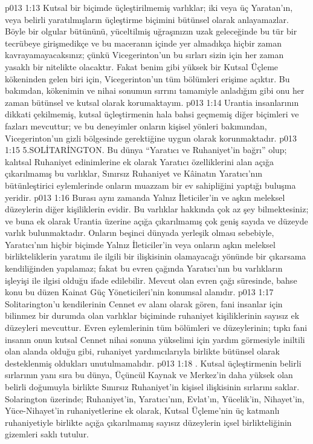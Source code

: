 \vs p013 1:13 Kutsal bir biçimde üçleştirilmemiş varlıklar; iki veya üç Yaratan’ın, veya belirli yaratılmışların üçleştirme biçimini bütünsel olarak anlayamazlar. Böyle bir olgular bütününü, yüceltilmiş uğraşınızın uzak geleceğinde bu tür bir tecrübeye girişmedikçe ve bu maceranın içinde yer almadıkça hiçbir zaman kavrayamayacaksınız; çünkü Vicegerinton’un bu sırları sizin için her zaman yasaklı bir nitelikte olacaktır. Fakat benim gibi yüksek bir Kutsal Üçleme kökeninden gelen biri için, Vicegerinton’un tüm bölümleri erişime açıktır. Bu bakımdan, kökenimin ve nihai sonumun sırrını tamamiyle anladığım gibi onu her zaman bütünsel ve kutsal olarak korumaktayım.
\vs p013 1:14 Urantia insanlarının dikkati çekilmemiş, kutsal üçleştirmenin hala bahsi geçmemiş diğer biçimleri ve fazları mevcuttur; ve bu deneyimler onların kişisel yönleri bakımından, Vicegerinton’un gizli bölgesinde gerektiğine uygun olarak korunmaktadır.
\vs p013 1:15 5.\bibnobreakspace SOLİTARİNGTON. Bu dünya “Yaratıcı ve Ruhaniyet’in bağrı” olup; kalıtsal Ruhaniyet edinimlerine ek olarak Yaratıcı özelliklerini alan açığa çıkarılmamış bu varlıklar, Sınırsız Ruhaniyet ve Kâinatın Yaratıcı’nın bütünleştirici eylemlerinde onların muazzam bir ev sahipliğini yaptığı buluşma yeridir.
\vs p013 1:16 Burası aynı zamanda Yalnız İleticiler’in ve aşkın meleksel düzeylerin diğer kişiliklerin evidir. Bu varlıklar hakkında çok az şey bilmektesiniz; ve buna ek olarak Urantia üzerine açığa çıkarılmamış çok geniş sayıda ve düzeyde varlık bulunmaktadır. Onların beşinci dünyada yerleşik olması sebebiyle, Yaratıcı’nın hiçbir biçimde Yalnız İleticiler’in veya onların aşkın meleksel birlikteliklerin yaratımı ile ilgili bir ilişkisinin olamayacağı yönünde bir çıkarsama kendiliğinden yapılamaz; fakat bu evren çağında Yaratıcı’nın bu varlıkların işleyişi ile ilgisi olduğu ifade edilebilir. Mevcut olan evren çağı süresinde, bahse konu bu düzen Kainat Güç Yöneticileri’nin konumsal alanıdır.
\vs p013 1:17 Solitarington’u kendilerinin Cennet ev alanı olarak gören, fani insanlar için bilinmez bir durumda olan varlıklar biçiminde ruhaniyet kişiliklerinin sayısız ek düzeyleri mevcuttur. Evren eylemlerinin tüm bölümleri ve düzeylerinin; tıpkı fani insanın onun kutsal Cennet nihai sonuna yükselimi için yardım görmesiyle iniltili olan alanda olduğu gibi, ruhaniyet yardımcılarıyla birlikte bütünsel olarak desteklenmiş oldukları unutulmamalıdır.
\vs p013 1:18 . Kutsal üçleştirmenin belirli sırlarının yanı sıra bu dünya, Üçüncül Kaynak ve Merkez’in daha yüksek olan belirli doğumuyla birlikte Sınırsız Ruhaniyet’in kişisel ilişkisinin sırlarını saklar. Solarington üzerinde; Ruhaniyet’in, Yaratıcı’nın, Evlat’ın, Yücelik’in, Nihayet’in, Yüce\hyp{}Nihayet’in ruhaniyetlerine ek olarak, Kutsal Üçleme’nin üç katmanlı ruhaniyetiyle birlikte açığa çıkarılmamış sayısız düzeylerin içsel birlikteliğinin gizemleri saklı tutulur.
